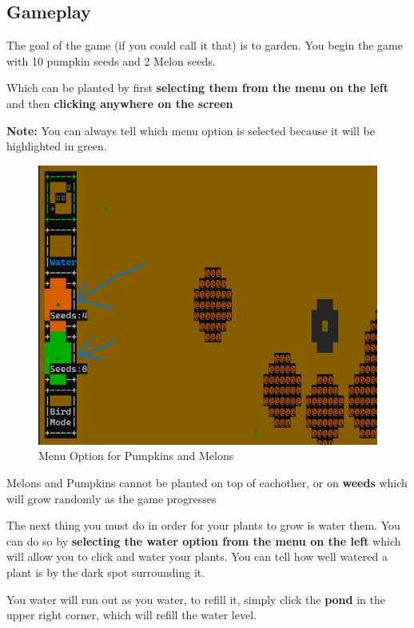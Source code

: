 \documentclass{article}
\begin{document}
\subsection*{Gameplay}
The goal of the game (if you could call it that) is to garden. You begin the game with 10 pumpkin seeds and 2 Melon seeds.

Which can be planted by first \textbf{selecting them from the menu on the left} and then \textbf{clicking anywhere on the screen}

\textbf{Note:} You can always tell which menu option is selected because it will be highlighted in green.

    \begin{figure}[H]
    \includegraphics[width=\textwidth]{melons-pumpkins.png}
    \caption{Menu Option for Pumpkins and Melons}
        
    \end{figure}

Melons and Pumpkins cannot be planted on top of eachother, or on \textbf{weeds} which will grow randomly as the game progresses

The next thing you must do in order for your plants to grow is water them. You can do so by \textbf{selecting the water option from the menu on the left} which will allow you to click and water your plants. You can tell how well watered a plant is by the dark spot surrounding it. 

You water will run out as you water, to refill it, simply click the \textbf{pond} in the upper right corner, which will refill the water level.
\end{document}
